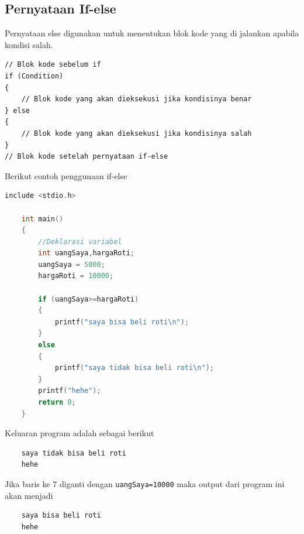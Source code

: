 \subsection{Pernyataan If-else}
Pernyataan else digunakan untuk menentukan blok kode yang di jalankan apabila kondisi salah. 
\begin{verbatim}
// Blok kode sebelum if
if (Condition) 
{
	// Blok kode yang akan dieksekusi jika kondisinya benar
} else
{
	// Blok kode yang akan dieksekusi jika kondisinya salah
}
// Blok kode setelah pernyataan if-else
\end{verbatim}
Berikut contoh penggunaan if-else
\begin{lstlisting}[language=c,caption = if-else example,label=lst:ifelseexample01]
	include <stdio.h>
	
	int main()
	{
		//Deklarasi variabel 
		int uangSaya,hargaRoti;
		uangSaya = 5000;
		hargaRoti = 10000;
		
		if (uangSaya>=hargaRoti)
		{
		    printf("saya bisa beli roti\n");
		}
		else
		{
	        printf("saya tidak bisa beli roti\n");	
		}
		printf("hehe");
		return 0;
	}
\end{lstlisting}                        
Keluaran program adalah sebagai berikut
\begin{verbatim}
    saya tidak bisa beli roti
    hehe
\end{verbatim}
Jika baris ke 7 diganti dengan \verb|uangSaya=10000| maka output dari program ini akan menjadi
\begin{verbatim}
    saya bisa beli roti
    hehe
\end{verbatim}

